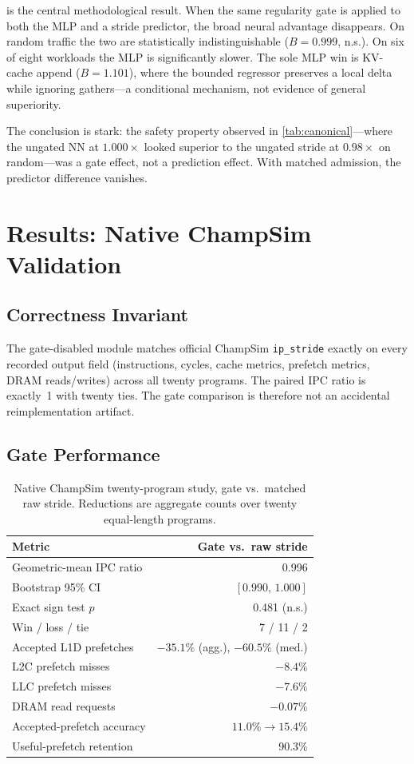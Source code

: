 \documentclass[sigplan,anonymous,review,nonacm]{acmart}
\begin{document}
 is the central methodological result. When the same
regularity gate is applied to both the MLP and a stride predictor, the
broad neural advantage disappears. On random traffic the two are
statistically indistinguishable ($B = 0.999$, n.s.). On six of eight
workloads the MLP is significantly slower. The sole MLP win is KV-cache
append ($B = 1.101$), where the bounded regressor preserves a local delta
while ignoring gathers---a conditional mechanism, not evidence of general
superiority.

The conclusion is stark: the safety property observed in
\cref{tab:canonical}---where the ungated NN at $1.000\times$ looked
superior to the ungated stride at $0.98\times$ on random---was a gate
effect, not a prediction effect. With matched admission, the predictor
difference vanishes.

\section{Results: Native ChampSim Validation}
\label{sec:champsim}

\subsection{Correctness Invariant}

The gate-disabled module matches official ChampSim \texttt{ip\_stride}
exactly on every recorded output field (instructions, cycles, cache metrics,
prefetch metrics, DRAM reads/writes) across all twenty programs. The
paired IPC ratio is exactly~1 with twenty ties. The gate comparison is
therefore not an accidental reimplementation artifact.

\subsection{Gate Performance}

\begin{table}[t]
\centering
\caption{Native ChampSim twenty-program study, gate vs.\ matched raw stride.
Reductions are aggregate counts over twenty equal-length programs.}
\label{tab:champsim}
\begin{tabular}{@{}l r@{}}
\toprule
Metric & Gate vs.\ raw stride \\
\midrule
Geometric-mean IPC ratio & 0.996 \\
Bootstrap 95\% CI        & $[0.990,\,1.000]$ \\
Exact sign test $p$      & 0.481 (n.s.) \\
Win / loss / tie         & 7 / 11 / 2 \\
Accepted L1D prefetches  & $-35.1\%$ (agg.), $-60.5\%$ (med.) \\
L2C prefetch misses      & $-8.4\%$ \\
LLC prefetch misses      & $-7.6\%$ \\
DRAM read requests       & $-0.07\%$ \\
Accepted-prefetch accuracy & $11.0\% \to 15.4\%$ \\
Useful-prefetch retention  & 90.3\% \\
\bottomrule
\end{tabular}
\end{table}
\end{document}
